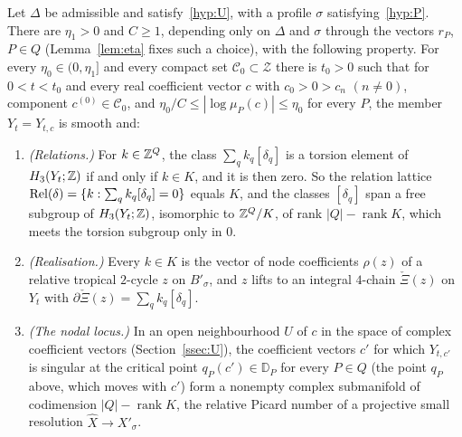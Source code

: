\begin{mainthm}\label{thm:main}
Let $\Delta$ be admissible and satisfy~\ref{hyp:U}, with a profile $\sigma$ satisfying~\ref{hyp:P}. There are $\eta_1>0$
and $C\ge1$, depending only on $\Delta$ and $\sigma$ through the vectors $r_P$, $P\in Q$ (Lemma~\ref{lem:eta} fixes such a
choice), with the following property. For every $\eta_0\in(0,\eta_1]$
and every compact set $\mathscr C_0\subset\mathcal Z$ there is $t_0>0$ such that for $0<t<t_0$ and every real coefficient
vector $c$ with $c_0>0>c_n$ $(n\neq0)$, component $c^{(0)}\in\mathscr C_0$, and
$\eta_0/C\le|\log\mu_P(c)|\le\eta_0$ for every $P$, the member $Y_t=Y_{t,c}$ is smooth and:
\begin{enumerate}
\item \emph{(Relations.)} For $k\in\mathbb Z^Q$, the class $\sum_qk_q[\delta_q]$ is a torsion element of $H_3(Y_t;\mathbb Z)$ if and
only if $k\in K$, and it is then zero. So the relation lattice
$\operatorname{Rel}(\delta)=\{k:\sum_qk_q[\delta_q]=0\}$ equals $K$, and the classes $[\delta_q]$ span a free subgroup of
$H_3(Y_t;\mathbb Z)$, isomorphic to $\mathbb Z^Q/K$, of rank $|Q|-\operatorname{rank}K$, which meets the torsion subgroup only in $0$.
\item \emph{(Realisation.)} Every $k\in K$ is the vector of node coefficients $\rho(z)$ of a relative tropical
$2$-cycle $z$ on $B'_\sigma$, and $z$ lifts to an integral $4$-chain $\check\Xi(z)$ on $Y_t$ with
$\partial\check\Xi(z)=\sum_qk_q[\delta_q]$.
\item \emph{(The nodal locus.)} In an open neighbourhood $U$ of $c$ in the space of complex coefficient vectors
(Section~\ref{ssec:U}), the coefficient vectors $c'$ for which $Y_{t,c'}$ is singular at the critical point
$q_P(c')\in\mathbb D_P$ for every $P\in Q$ (the point $q_P$ above, which moves with $c'$) form a nonempty complex submanifold of
codimension $|Q|-\operatorname{rank}K$, the relative Picard number of a projective small resolution
$\widehat X\to X'_\sigma$.
\end{enumerate}
\end{mainthm}

